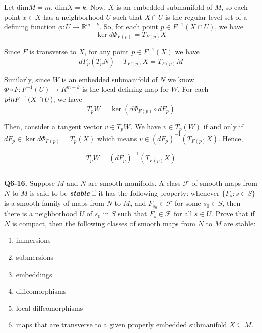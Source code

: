 \documentclass{article}
\newcommand{\R}{\mathbb{R}}
\begin{document}

Let dim$M = m$, dim$X = k$. Now, $X$ is an embedded submanifold of $M$, so each point $x \in X$ has a neighborhood $U$ such that $X \cap U$ is the regular level set of a defining function $\phi : U \rightarrow \R^{m - k}$. So, for each point $p \in F^{-1}(X \cap U)$, we have 
\[ \ker d\Phi_{F(p)} = T_{F(p)} X \]

\vskip 0.25cm
Since $F$ is transverse to $X$, for any point $p \in F^{-1}(X)$ we have 
\[ dF_p(T_pN) + T_{F(p)} X = T_{F(p)} M\]

Similarly, since $W$ is an embedded submanifold of $N$ we know 
$\Phi \circ F : F^{-1}(U) \rightarrow R^{m-k}$ is the local defining map for $W$. For each $p \\in F^{-1}(X \cap U)$, we have 
\[ T_{p} W = \ker \left(d\Phi_{F(p)} \circ dF_p \right)  \]

\vskip 0.25cm
Then, consider a tangent vector $v \in T_{p}W$. We have $v \in T_p(W)$ if and only if $dF_{p} \in \ker d\Phi_{F(p)} = T_{p}(X)$ which means $v \in \left(dF_p\right)^{-1}\left(T_{F(p)}X\right)$. Hence,

\[ T_p W = \left(dF_p\right)^{-1} \left( T_{F(p)} X\right) \]


\vskip 0.5cm
\hrule 
\vskip 0.5cm



\textbf{Q6-16.} Suppose $M$ and $N$ are smooth manifolds. A class $\mathcal{F}$ of smooth maps from $N$ to $M$ is said to be \emph{\textbf{stable}} if it has the following property: whenever $\{F_s : s \in S \}$ is a smooth family of maps from $N$ to $M$, and $F_{s_0} \in \mathcal{F}$ for some $s_0 \in S$, then there is a neighborhood $U$ of $s_0$ in $S$ such that $F_s \in \mathcal{F}$ for all $s \in U$. Prove that if $N$ is compact, then the following classes of smooth maps from $N$ to $M$ are stable:
\begin{enumerate}[label=(\alph*)]
  \item immersions
  \item submersions
  \item embeddings
  \item diffeomorphisms
  \item local diffeomorphisms
  \item maps that are transverse to a given properly embedded submanifold $X \subseteq M$.
\end{enumerate}
\end{document}
